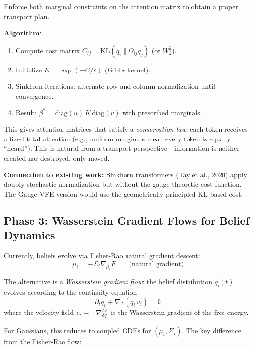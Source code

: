 \documentclass[11pt]{article}
\newcommand{\KL}{\mathrm{KL}}
\begin{document}
Enforce both marginal constraints on the attention matrix to obtain a proper transport plan.

\textbf{Algorithm:}
\begin{enumerate}
    \item Compute cost matrix $C_{ij} = \KL(q_i \| \Omega_{ij}q_j)$ (or $W_2^2$).
    \item Initialize $K = \exp(-C/\varepsilon)$ (Gibbs kernel).
    \item Sinkhorn iterations: alternate row and column normalization until convergence.
    \item Result: $\beta^* = \text{diag}(u)\,K\,\text{diag}(v)$ with prescribed marginals.
\end{enumerate}

This gives attention matrices that satisfy a \emph{conservation law}: each token receives a fixed total attention (e.g., uniform marginals mean every token is equally ``heard''). This is natural from a transport perspective---information is neither created nor destroyed, only moved.

\textbf{Connection to existing work:} Sinkhorn transformers (Tay et al., 2020) apply doubly stochastic normalization but without the gauge-theoretic cost function. The Gauge-VFE version would use the geometrically principled $\KL$-based cost.

\subsection{Phase 3: Wasserstein Gradient Flows for Belief Dynamics}

Currently, beliefs evolve via Fisher-Rao natural gradient descent:
\begin{equation}
\dot{\mu}_i = -\Sigma_i \nabla_{\mu_i} F \qquad \text{(natural gradient)}
\end{equation}

The alternative is a \emph{Wasserstein gradient flow}: the belief distribution $q_i(t)$ evolves according to the continuity equation
\begin{equation}
\partial_t q_i + \nabla \cdot (q_i\, v_i) = 0
\end{equation}
where the velocity field $v_i = -\nabla \frac{\delta F}{\delta q_i}$ is the Wasserstein gradient of the free energy.

For Gaussians, this reduces to coupled ODEs for $(\mu_i, \Sigma_i)$. The key difference from the Fisher-Rao flow:
\end{document}
